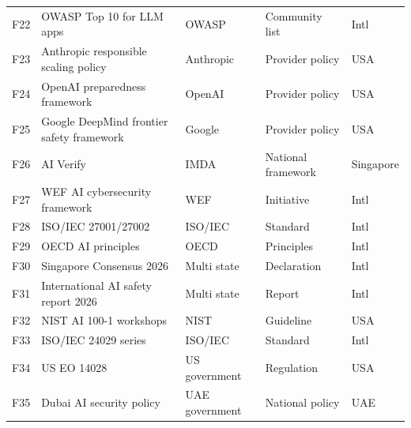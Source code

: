 \documentclass[runningheads]{llncs}
\begin{document}
\begin{table}[t]
\begin{tabular}{@{}p{0.8cm}p{5.5cm}p{2.5cm}p{2.3cm}p{2.3cm}@{}}
F22 & OWASP Top 10 for LLM apps & OWASP & Community list & Intl\\
F23 & Anthropic responsible scaling policy & Anthropic & Provider policy & USA\\
F24 & OpenAI preparedness framework & OpenAI & Provider policy & USA\\
F25 & Google DeepMind frontier safety framework & Google & Provider policy & USA\\
F26 & AI Verify & IMDA & National framework & Singapore\\
F27 & WEF AI cybersecurity framework & WEF & Initiative & Intl\\
F28 & ISO/IEC 27001/27002 & ISO/IEC & Standard & Intl\\
F29 & OECD AI principles & OECD & Principles & Intl\\
F30 & Singapore Consensus 2026 & Multi state & Declaration & Intl\\
F31 & International AI safety report 2026 & Multi state & Report & Intl\\
F32 & NIST AI 100-1 workshops & NIST & Guideline & USA\\
F33 & ISO/IEC 24029 series & ISO/IEC & Standard & Intl\\
F34 & US EO 14028 & US government & Regulation & USA\\
F35 & Dubai AI security policy & UAE government & National policy & UAE\\
\bottomrule
\end{tabular}
\end{table}
\end{document}
